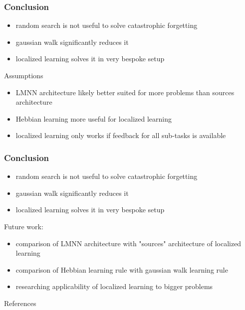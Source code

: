 \documentclass[14pt]{beamer}
\theoremstyle{remark}
\begin{document}
\begin{frame}[t]
    \frametitle{Conclusion}

    \begin{itemize}
        \item random search is not useful to solve catastrophic forgetting
        \vfill
        \item gaussian walk significantly reduces it
        \vfill
        \item localized learning solves it in very bespoke setup
	\end{itemize}

    Assumptions
    \begin{itemize}
        \item LMNN architecture likely better suited for more problems than
              sources architecture
        \vfill
        \item Hebbian learning more useful for localized learning
        \vfill
        \item localized learning only works if feedback for all sub-tasks is
              available
    \end{itemize}
\end{frame}

\begin{frame}[t]
    \frametitle{Conclusion}

    \begin{itemize}
        \item random search is not useful to solve catastrophic forgetting
        \vfill
        \item gaussian walk significantly reduces it
        \vfill
        \item localized learning solves it in very bespoke setup
	\end{itemize}

    Future work:
    \begin{itemize}
        \item comparison of LMNN architecture with "sources" architecture of
              localized learning
        \vfill
        \item comparison of Hebbian learning rule with gaussian walk learning rule
        \vfill
        \item researching applicability of localized learning to bigger problems
    \end{itemize}
\end{frame}



\begin{frame}[allowframebreaks]{References}
    \printbibliography
\end{frame}
\end{document}
